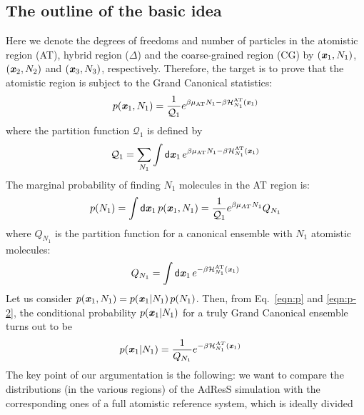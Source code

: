 \documentclass[aip,jcp,a4paper,reprint,onecolumn]{revtex4-1}
\newcommand{\vect}[1]{\textbf{\textit{#1}}}
\newcommand{\dd}[1]{\textsf{#1}}
\newcommand{\AT}{{\textrm{{AT}}}}
\newcommand{\HY}{{\Delta}}
\begin{document}
\subsection{The outline of the basic idea}
Here we denote the degrees of freedoms and number of particles in the
atomistic region (AT), hybrid region ($\HY$) and the coarse-grained
region (CG) by $(\vect x_1, N_1)$, $(\vect x_2, N_2)$ and $(\vect x_3,
N_3)$, respectively. Therefore, the target is to prove that the atomistic
region is subject to the Grand Canonical statistics: 
\begin{align}\label{eqn:p}
  p(\vect x_1, N_1) = \frac{1}{\mathcal Q_1}
  e^{\beta\mu_{\AT} N_1 - \beta \mathcal H_{N_1}^{\AT}(\vect x_1)} 
\end{align}
where the partition function $\mathcal Q_1$ is defined by
\begin{align}
  \mathcal Q_1 =
  \sum_{N_1}\int
  \dd d\vect x_1\,
  e^{\beta\mu_{\AT} N_1 - \beta \mathcal H_{N_1}^{\AT}(\vect x_1)}
\end{align}
The marginal probability of finding $N_1$ molecules in the
AT region is:
\begin{align}\label{eqn:p-2}
  p(N_1) = \int\dd d\vect x_1\, p(\vect x_1, N_1)
  =
  \frac{1}{\mathcal Q_1}e^{\beta\mu_{AT} N_1}Q_{N_1}
\end{align}
where $Q_{N_1}$ is the partition function for a canonical ensemble
with $N_1$ atomistic molecules:
\begin{align}
  Q_{N_1}  =
  \int\dd d\vect x_1\,
  e^{ - \beta \mathcal H_{N_1}^{\AT}(\vect x_1)}
\end{align}
Let us consider
$p(\vect x_1, N_1) = p(\vect x_1 | N_1)\,p(N_1)$. Then,
from Eq.~\eqref{eqn:p} and \eqref{eqn:p-2},
the conditional probability $p(\vect x_1 | N_1)$
for a truly Grand Canonical ensemble turns out to be
\begin{align}\label{eqn:p-1}
  p(\vect x_1 | N_1) &= \frac{1}{Q_{N_1}} e^{-\beta \mathcal H_{N_1}^{AT}(\vect x_1)} \end{align}
The key point of our argumentation is the following: we want to compare
the distributions (in the various regions) of the AdResS simulation
with the corresponding ones of a full atomistic reference system, which is ideally divided
\end{document}
